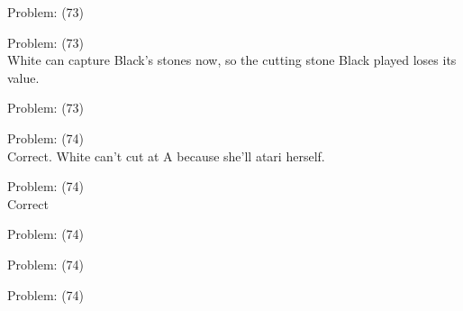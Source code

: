 \documentclass[11pt]{article}
\begin{document}
\begin{minipage}[t]{0.5\textwidth}
  {\centering
  
Problem: (73)\\
  }
\end{minipage}
\begin{minipage}[t]{0.5\textwidth}
  {\centering
  
Problem: (73)\\
White can capture Black's stones now, so the cutting stone Black played loses its value.\\
  }
\end{minipage}
\begin{minipage}[t]{0.5\textwidth}
  {\centering
  
Problem: (73)\\
  }
\end{minipage}
\begin{minipage}[t]{0.5\textwidth}
  {\centering
  
Problem: (74)\\
Correct. White can't cut at A because she'll atari herself.\\
  }
\end{minipage}
\begin{minipage}[t]{0.5\textwidth}
  {\centering
  
Problem: (74)\\
Correct\\
  }
\end{minipage}
\begin{minipage}[t]{0.5\textwidth}
  {\centering
  
Problem: (74)\\
  }
\end{minipage}
\begin{minipage}[t]{0.5\textwidth}
  {\centering
  
Problem: (74)\\
  }
\end{minipage}
\begin{minipage}[t]{0.5\textwidth}
  {\centering
  
Problem: (74)\\
  }
\end{minipage}
\end{document}
